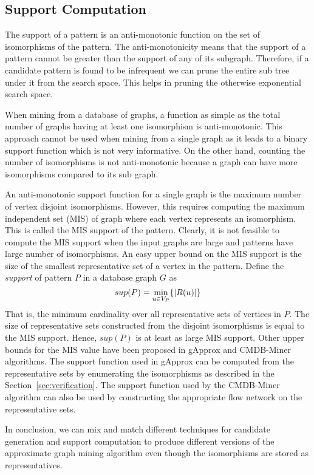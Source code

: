 \subsection{Support Computation} \label{sec:support} The support of a pattern is
an anti-monotonic function on the set of isomorphisms of the pattern. The
anti-monotonicity means that the support of a pattern cannot be greater than the
support of any of its subgraph. Therefore, if a candidate pattern is found to be
infrequent we can prune the entire sub tree under it from the search space.
This helps in pruning the otherwise exponential search space. 

When mining from a database of graphs, a function as simple as the total number
of graphs having at least one isomorphism is anti-monotonic. This approach cannot
be used when mining from a single graph as it leads to a binary support function
which is not very informative. On the other hand, counting the number of
isomorphisms is not anti-monotonic because a graph can have more isomorphisms
compared to its sub graph.

An anti-monotonic support function for a single graph is the maximum number of
vertex disjoint isomorphisms. However, this requires computing the maximum
independent set (MIS) of graph where each vertex represents an isomorphism.
This is called the MIS support of the pattern.
Clearly, it is not feasible to compute the MIS support
when the input graphs are large and patterns have
large number of isomorphisms. An easy upper bound on the MIS support is the size
of the smallest representative set of a vertex in the pattern.  Define the {\em
support} of pattern $P$ in a database graph $G$ as $$sup(P) = \min_{u \in V_P}
\{ |R(u)| \}$$ That is, the minimum cardinality over all representative sets of
vertices in $P$.  The size of representative sets constructed from the disjoint
isomorphisms is equal to the MIS support. Hence, $sup(P)$ is at least as large
MIS support.  Other upper bounds for the MIS value have been proposed in gApprox \cite{gapprox}
and CMDB-Miner \cite{2011-icdm} algorithms. The support function used in gApprox can be computed
from the representative sets by enumerating the isomorphisms as described in the
Section~\ref{sec:verification}.  The support function used by the CMDB-Miner
algorithm can also be used by constructing the appropriate flow network on the
representative sets.

In conclusion, we can mix and match different techniques for candidate
generation and support computation to produce different versions of the
approximate graph mining algorithm even though the isomorphisms are stored as
representatives.

